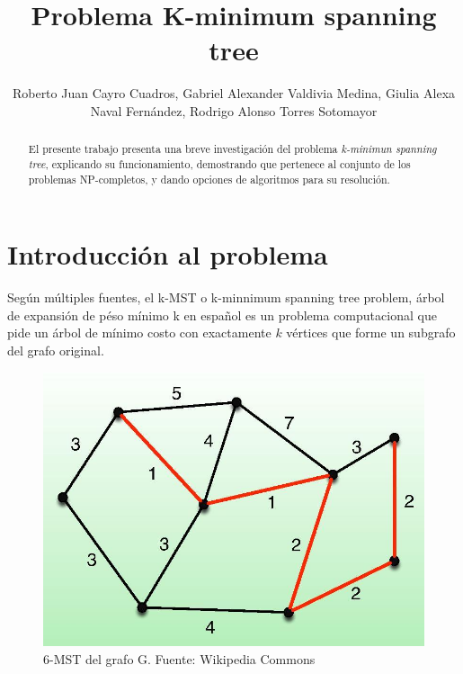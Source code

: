 \documentclass[spanish,12pt]{elsarticle}
\begin{document}
\begin{frontmatter}
\title{Problema K-minimum spanning tree}
\author{Roberto Juan Cayro Cuadros, Gabriel Alexander Valdivia Medina,
Giulia Alexa Naval Fernández, Rodrigo Alonso Torres Sotomayor}
\begin{abstract}
    El presente trabajo presenta una breve investigación del problema \textit{k-minimun spanning tree}, explicando su funcionamiento, demostrando que pertenece al conjunto de los problemas NP-completos, y dando opciones de algoritmos para su resolución.\\
\end{abstract}
\address{Universidad Católica San Pablo}

\end{frontmatter}


\section{Introducción al problema}
Según múltiples fuentes\cite{2}\cite{4}, el k-MST o k-minnimum spanning tree problem, árbol de expansión de péso mínimo k en español es un problema computacional que pide un árbol de mínimo costo con exactamente $k$ vértices que forme un subgrafo del grafo original.
\begin{figure}[h]
    \centering
    \includegraphics[scale=0.5]{images/6-mst.jpg}
    \caption{6-MST del grafo G. Fuente: Wikipedia Commons}
    \label{fig:my_label}
\end{figure}
\end{document}
